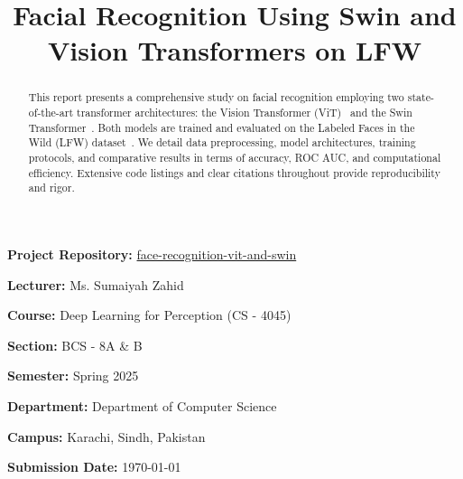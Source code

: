 \documentclass[twocolumn]{IEEEtran}
\begin{document}
\begin{titlepage}
\begin{flushleft}
        \textbf{Project Repository:} \href{https://github.com/muhammadhamzagova666/face-recognition-vit-and-swin}{face-recognition-vit-and-swin}\\
        \vspace{10pt}
        
        \textbf{Lecturer:} Ms. Sumaiyah Zahid\\
        \vspace{10pt}
        
        \textbf{Course:} Deep Learning for Perception (CS - 4045)\\
        \vspace{10pt}

        \textbf{Section:} BCS - 8A \& B\\
        \vspace{10pt}

        \textbf{Semester:} Spring 2025\\
        \vspace{10pt}

        \textbf{Department:} Department of Computer Science\\
        \vspace{10pt}

        \textbf{Campus:} Karachi, Sindh, Pakistan\\
        \vspace{10pt}
        
        \textbf{Submission Date:} \today\\  
    \end{flushleft}
\end{titlepage}

\title{Facial Recognition Using Swin and Vision Transformers on LFW}
\maketitle

\begin{abstract}
This report presents a comprehensive study on facial recognition employing two state-of-the-art transformer architectures: the Vision Transformer (ViT)~\cite{dosovitskiy2020image} and the Swin Transformer~\cite{liu2021swin}. Both models are trained and evaluated on the Labeled Faces in the Wild (LFW) dataset~\cite{huang2008lfw}. We detail data preprocessing, model architectures, training protocols, and comparative results in terms of accuracy, ROC AUC, and computational efficiency. Extensive code listings and clear citations throughout provide reproducibility and rigor.
\end{abstract}
\end{document}

